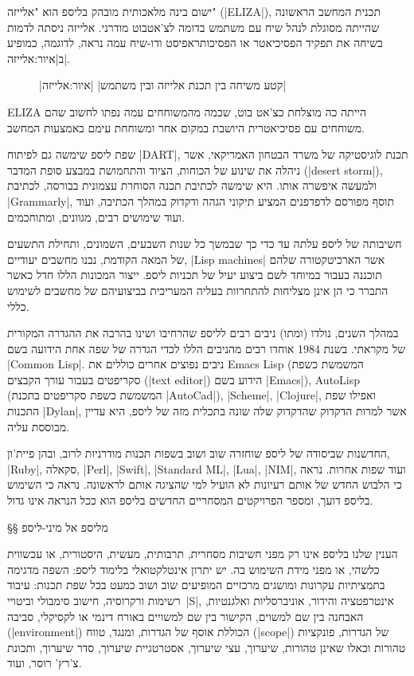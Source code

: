 ישום בינה מלאכותית מובהק בליספ הוא "אלייזה" (\E|ELIZA|), תכנית המחשב הראשונה
שהייתה מסוגלת לנהל שיח עם משתמש בדומה לצ'אטבוט מודרני. אלייזה ניסתה לדמות בשיחה
את תפקיד הפסיכיאטר או הפסיכותראפיסט ודו-שיח עמה נראה, לדוגמה, כמופיע
ב|איור:אלייזה|.

\begin{figure}[H]
\begin{LTR} \scriptsize
  
\end{LTR}
|קטע משיחה בין תכנת אלייזה ובין משתמש|
|איור:אלייזה|
\end{figure}

ELIZA הייתה כה מוצלחת כצ'אט בוט, שכמה מהמשוחחים עמה נפתו לחשוב שהם משוחחים עם
פסיכיאטרית היושבת במקום אחר ומשוחחת עימם באמצעות המחשב.

שפת ליספ שימשה גם לפיתוח \E|DART|, תכנת לוגיסטיקה של משרד הבטחון האמריקאי, אשר
ניהלה את שינוע של הכוחות, הציוד והתחמושת במבצע סופת המדבר (\E|desert storm|),
ולמעשה איפשרה אותו. היא שימשה לכתיבת תכנה הסוחרת עצמונית בבורסה, לכתיבת
\E|Grammarly|, תוסף מפורסם לדפדפנים המציע תיקוני הגהה ודקדוק במהלך הכתיבה, ועוד
ועוד שימושים רבים, מגוונים, ומתוחכמים.

חשיבותה של ליספ עלתה עד כדי כך שבמשך כל שנות השבעים, השמונים, ותחילת התשעים של
המאה הקודמת, נבנו מחשבים יעודיים, \E|Lisp machines| אשר הארכיטקטורה שלהם תוכננה
בעבור במיוחד לשם ביצוע יעיל של תכניות ליספ. ייצור המכונות הללו חדל כאשר התברר
כי הן אינן מצליחות להתחרוות בעליה המעריכית בביצועיהם של מחשבים לשימוש כללי.

במהלך השנים, נולדו (ומתו) ניבים רבים לליספ שהרחיבו ושינו בהרבה את ההגדרה
המקורית של מקראתי. בשנת 1984 אוחדו רבים מהניבים הללו לכדי הגדרה של שפה אחת
הידועה בשם \E|Common Lisp|. ניבים נפוצים אחרים כוללים את Emacs Lisp (המשמשת
כשפת סקריפטים בעבור עורך הקבצים (\E|text editor|) הידוע בשם \E|Emacs|),
AutoLisp (המשמשת כשפת סקריפטים בתכנת \E|AutoCad|), \E|Scheme|, \E|Clojure|,
ואפילו שפת התכנות \E|Dylan|, אשר למרות הדקדוק שהדקדוק שלה שונה בתכלית מזה של
ליספ, היא עדיין מבוססת עליה.

החדשנות שביסודה של ליספ שוחזרה שוב ושוב בשפות תכנות מודרניות לרוב, ובהן
פיית'ון, \E|Ruby|, סקאלה, \E|Perl|, \E|Swift|, \E|Standard ML|, \E|Lua|,
\E|NIM|, ועוד שפות אחרות. נראה כי הלבוש החדש של אותם רעיונות לא הועיל למי
שהציגה אותם לראשונה. נראה כי השימוש בליספ דועך, ומספר הפרויקטים המסחריים החדשים
בליספ הוא ככל הנראה אינו גדול.

§§ מליספ אל מיני-ליספ

הענין שלנו בליספ אינו רק מפני חשיבות מסחרית, תרבותית, מעשית, היסטורית, או
עכשווית כלשהי, או מפני מידת השימוש בה. יש יתרון אינטלקטואלי בלימוד ליספ:
השפה מדגימה בתמציתיות עקרונות ומושגים מרכזיים המופיעים שוב ושוב כמעט בכל שפת
תכנות: עיבוד רשימות ורקרוסיה, חישוב סימבולי וביטויי~\E|S|, אינטרפטציה והידור,
אוניברסליות ואלגנטיות, האבחנה בין שם למשוים, הקישור בין שם למשויים באורח דינמי
או לקסיקלי, סביבה (\E|environment|) הכוללת אוסף של הגדרות, ומנגד, טווח
(\E|scope|) של הגדרות, פונקציות טהורות וכאלו שאינן טהורות, שיערוך, עצי שיערוך,
אסטרטגיית שיערוך, סדר שיערוך, ותכונת צ'רץ' רוסר, ועוד.

